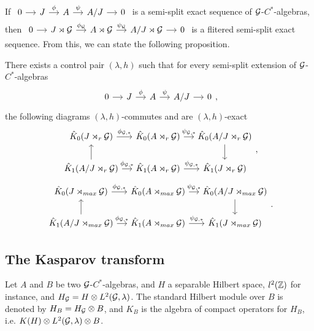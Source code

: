 If $\begin{tikzcd}[column sep = small]
0 \arrow{r} & J\arrow{r}{\phi}& A \arrow{r}{\psi} & A/J \arrow{r} & 0
\end{tikzcd}$ is a semi-split exact sequence of $\mathcal G$-$C^*$-algebras, then 
$\begin{tikzcd}[column sep = small]
0 \arrow{r} & J\rtimes \G\arrow{r}{\phi_\G}& A\rtimes \G \arrow{r}{\psi_\G} & A/J\rtimes \G \arrow{r} & 0
\end{tikzcd}$ is a flitered semi-split exact sequence. From this, we can state the following proposition.\\

\begin{prop}
There exists a control pair $(\lambda,h)$ such that for every semi-split extension of $\mathcal G$-$C^*$-algebras
\[\begin{tikzcd}[column sep = small]
0 \arrow{r} & J\arrow{r}{\phi}& A \arrow{r}{\psi} & A/J \arrow{r} & 0
\end{tikzcd},\]
the following diagrams $(\lambda,h)$-commutes and are $(\lambda,h)$-exact 
\[\begin{tikzcd}[column sep = small]
\hat K_0(J\rtimes_r \G) \arrow{r}{\phi_{\G,*}}&\hat K_0( A\rtimes_r \G ) \arrow{r}{\psi_{\G,*}} & \hat K_0( A/J\rtimes_r \G) \arrow{d} \\
\hat K_1(A/J\rtimes_r \G) \arrow{u} \arrow{r}{\phi_{\G,*}}& \hat K_1( A\rtimes_r \G ) \arrow{r}{\psi_{\G,*}} & \hat K_1( J\rtimes_r \G)
\end{tikzcd},\]
\[\begin{tikzcd}[column sep = small]
\hat K_0(J\rtimes_{max} \G) \arrow{r}{\phi_{\G,*}}&\hat K_0( A\rtimes_{max} \G ) \arrow{r}{\psi_{\G,*}} & \hat K_0( A/J\rtimes_{max} \G) \arrow{d} \\
\hat K_1(A/J\rtimes_{max} \G) \arrow{u} \arrow{r}{\phi_{\G,*}}& \hat K_1( A\rtimes_{max} \G ) \arrow{r}{\psi_{\G,*}} & \hat K_1( J\rtimes_{max} \G)
\end{tikzcd}.\]
\end{prop}

\subsection{The Kasparov transform}

Let $A$ and $B$ be two $\mathcal G$-$C^*$-algebras, and $H$ a separable Hilbert space, $l^2(\mathbb Z)$ for instance, and $H_\mathcal G= H\otimes L^2(\mathcal G,\lambda)$. The standard Hilbert module over $B$ is denoted by $H_B=H_\mathcal G\otimes B$, and $K_B$ is the algebra of compact operators for $H_B$, i.e. $K(H)\otimes L^2(\mathcal G,\lambda)\otimes B$. \\

